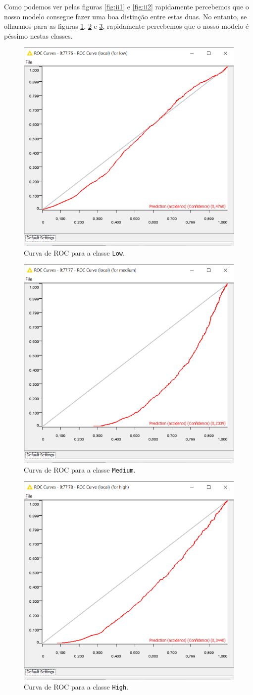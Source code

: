 Como podemos ver pelas figuras \ref{fig:ii1} e \ref{fig:ii2} rapidamente percebemos que o nosso modelo consegue fazer uma boa distinção entre estas duas. No entanto, se olharmos para as figuras \ref{fig:ii3}, \ref{fig:ii4} e \ref{fig:ii5}, rapidamente percebemos que o nosso modelo é péssimo nestas classes.

\begin{figure}[H]
    \centering
    \includegraphics[width=0.4\linewidth]{Figures/ROC/low.png}
    \caption{Curva de ROC para a classe \texttt{Low}.}
    \label{fig:ii3}
\end{figure}

\begin{figure}[H]
    \centering
    \includegraphics[width=0.4\linewidth]{Figures/ROC/medium.png}
    \caption{Curva de ROC para a classe \texttt{Medium}.}
    \label{fig:ii4}
\end{figure}

\begin{figure}[H]
    \centering
    \includegraphics[width=0.4\linewidth]{Figures/ROC/high.png}
    \caption{Curva de ROC para a classe \texttt{High}.}
    \label{fig:ii5}
\end{figure}

